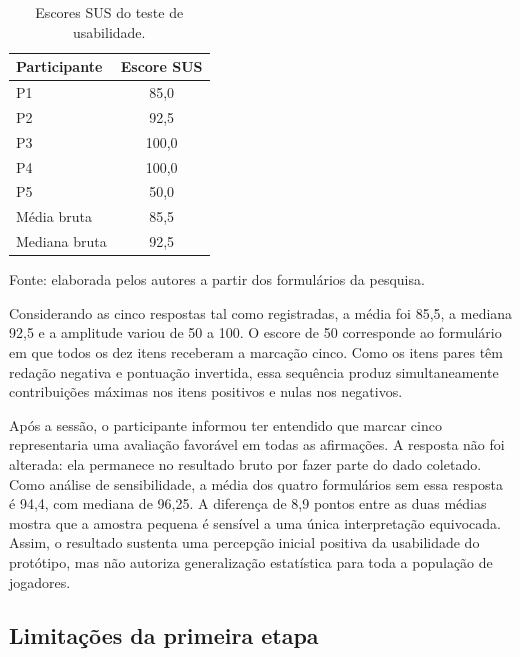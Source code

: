         \begin{table}[htb]
            \centering
            \caption{Escores SUS do teste de usabilidade.}
            \label{tab:sus-resultados}
            \begin{tabular}{lc}
                \toprule
                \textbf{Participante} & \textbf{Escore SUS} \\
                \midrule
                P1 & 85,0 \\
                P2 & 92,5 \\
                P3 & 100,0 \\
                P4 & 100,0 \\
                P5 & 50,0 \\
                \midrule
                Média bruta & 85,5 \\
                Mediana bruta & 92,5 \\
                \bottomrule
            \end{tabular}

            \vspace{2pt}
            {\footnotesize Fonte: elaborada pelos autores a partir dos formulários da pesquisa.}
        \end{table}

        Considerando as cinco respostas tal como registradas, a média foi 85,5, a mediana 92,5 e a amplitude variou de 50 a 100. O escore de 50 corresponde ao formulário em que todos os dez itens receberam a marcação cinco. Como os itens pares têm redação negativa e pontuação invertida, essa sequência produz simultaneamente contribuições máximas nos itens positivos e nulas nos negativos.

        Após a sessão, o participante informou ter entendido que marcar cinco representaria uma avaliação favorável em todas as afirmações. A resposta não foi alterada: ela permanece no resultado bruto por fazer parte do dado coletado. Como análise de sensibilidade, a média dos quatro formulários sem essa resposta é 94,4, com mediana de 96,25. A diferença de 8,9 pontos entre as duas médias mostra que a amostra pequena é sensível a uma única interpretação equivocada. Assim, o resultado sustenta uma percepção inicial positiva da usabilidade do protótipo, mas não autoriza generalização estatística para toda a população de jogadores.

    \subsection{Limitações da primeira etapa}

